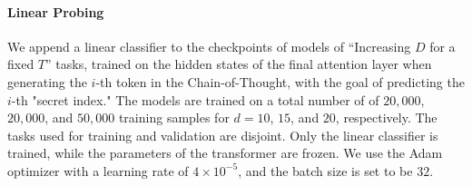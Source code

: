 \paragraph{Linear Probing}


We append a linear classifier to the checkpoints of models of ``Increasing $D$ for a fixed $T$'' tasks, trained on the hidden states of the final attention layer when generating the $i$-th token in the Chain-of-Thought, with the goal of predicting the $i$-th "secret index." The models are trained on a total number of of $20,000$, $20,000$, and $50,000$ training samples for $d = 10$, $15$, and $20$, respectively. The tasks used for training and validation are disjoint. Only the linear classifier is trained, while the parameters of the transformer are frozen. We use the Adam optimizer with a learning rate of $4 \times 10^{-5}$, and the batch size is set to be $32$.